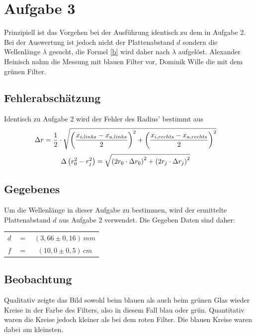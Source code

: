 \section{Aufgabe 3}
Prinzipiell ist das Vorgehen bei der Ausführung identisch zu dem in Aufgabe 2. Bei der Auswertung ist jedoch nicht der Plattenabstand \(d\) sondern die Wellenlänge \(\lambda \) gesucht, die Formel \eqref{b} wird daher nach \(\lambda \) aufgelöst. Alexander Heinisch nahm die Messung mit blauen Filter vor, Dominik Wille die mit dem grünen Filter.
\subsection{Fehlerabschätzung}
Identisch zu Aufgabe 2 wird der Fehler des Radius' bestimmt aus
\begin{align}
\Delta r &= \frac{1}{2} \cdot \sqrt{
\left( \frac{x_{i,links} - x_{a,links}}{2} \right)^2 +
\left( \frac{x_{i,rechts} - x_{a,rechts}}{2} \right)^2
} \notag
\end{align}
\begin{align}
\Delta \left( r_0^2 - r_j^2 \right) &= \sqrt{
\left( 2 r_0 \cdot \Delta r_0 \right)^2 +
\left( 2 r_j \cdot \Delta r_j \right)^2
} \notag
\end{align}
\subsection{Gegebenes}
Um die Wellenlänge in dieser Aufgabe zu bestimmen, wird der ermittelte Plattenabstand \(d\) aus Aufgabe 2 verwendet. Die Gegeben Daten sind daher:
\begin{center}
\begin{tabular}{rcc}
\(d\) & \(=\) & \(\left( 3,66 \pm 0,16 \right)\, mm\) \\
\(f\) & \(=\) & \(\left( 10,0 \pm 0,5 \right)\, cm\) \\
\end{tabular}
\end{center}
\subsection{Beobachtung}
Qualitativ zeigte das Bild sowohl beim blauen als auch beim grünen Glas wieder Kreise in der Farbe des Filters, also in diesem Fall blau oder grün. Quantitativ waren die Kreise jedoch kleiner als bei dem roten Filter. Die blauen Kreise waren dabei am kleinsten.
